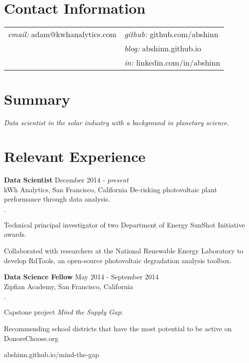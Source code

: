 \documentclass[margin,line]{res}
\newenvironment{list2}{
  \begin{list}{$\cdot$}{%
      \setlength{\itemsep}{0in}
      \setlength{\parsep}{0in} \setlength{\parskip}{0in}
      \setlength{\topsep}{0in} \setlength{\partopsep}{0in} 
      \setlength{\leftmargin}{0.2in}}}{\end{list}}
\begin{document}

\begin{resume}


\section{\sc Contact Information}

\vspace{.1 in}
\begin{tabular}{@{}p{3in}p{4in}}
{\it email:} adam@kwhanalytics.com & {\it github:} github.com/abshinn\\
& {\it blog:} abshinn.github.io\\
& {\it in:} linkedin.com/in/abshinn\\
\end{tabular}


\section{\sc Summary}

{\it Data scientist in the solar industry with a background in planetary science.}


\section{\sc Relevant Experience}

{\bf Data Scientist} \hfill {December 2014 - {\em present}}\\
kWh Analytics, San Francisco, California
De-risking photovoltaic plant performance through data analysis.
\begin{list2}
\item[] Technical principal investigator of two Department of Energy SunShot Initiative awards.
\item[] Collaborated with researchers at the National Renewable Energy Laboratory to develop
  RdTools, an open-source photovoltaic degradation analysis toolbox.
\end{list2}

{\bf Data Science Fellow} \hfill {May 2014 - September 2014}\\
Zipfian Academy, San Francisco, California
\begin{list2}
\item Capstone project {\em Mind the Supply Gap}:
\item[] Recommending school districts that have the most potential to be active on DonorsChoose.org
\item[] abshinn.github.io/mind-the-gap
\end{list2}


\end{resume}
\end{document}
